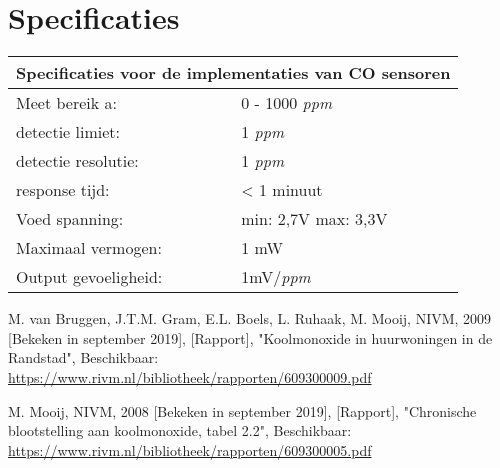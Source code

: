 \documentclass[a4paper, 11pt]{article} %
\begin{document}
\section{Specificaties}
\begin{center}
	\begin{tabular}{ | m{5cm} | m{5cm}| } 
		\hline
		\multicolumn{2}{|c|}{Specificaties voor de implementaties van CO sensoren} \\
		\hline
		Meet bereik a: & 0 - 1000 \textit{ppm} \\
		\hline
		detectie limiet:  & 1 \textit{ppm}
		\\ 
		\hline
		detectie resolutie: & 1 \textit{ppm} 
		\\ 
		\hline
		response tijd: & < 1 minuut
		\\ 
		\hline
		Voed spanning: & min: 2,7V max: 3,3V
		\\ 
		\hline
		Maximaal vermogen: & 1 mW
		\\
		\hline
		Output gevoeligheid: & 1mV/\textit{ppm}
		\\
		\hline
	\end{tabular}
\end{center}
\newpage
\begin{thebibliography}{9}
	M. van Bruggen, J.T.M. Gram, E.L. Boels, L. Ruhaak, M. Mooij,
	NIVM,
	2009 [Bekeken in september 2019],
	[Rapport],
	"Koolmonoxide in huurwoningen in de Randstad",
	Beschikbaar: \url{https://www.rivm.nl/bibliotheek/rapporten/609300009.pdf}
	
	M. Mooij,
	NIVM,
	2008 [Bekeken in september 2019],
	[Rapport],
	"Chronische blootstelling aan koolmonoxide, tabel 2.2",
	Beschikbaar: \url{https://www.rivm.nl/bibliotheek/rapporten/609300005.pdf}
	
\end{thebibliography}
\end{document}

